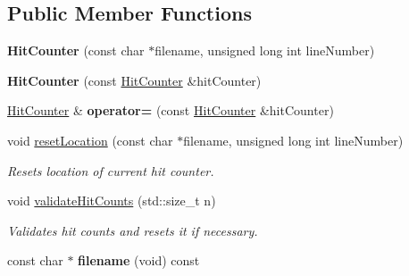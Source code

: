\subsection*{Public Member Functions}
\begin{DoxyCompactItemize}
\item 
\hypertarget{classel_1_1base_1_1HitCounter_a1fe641f45123641012673f8bc29aefd8}{{\bfseries Hit\-Counter} (const char $\ast$filename, unsigned long int line\-Number)}\label{classel_1_1base_1_1HitCounter_a1fe641f45123641012673f8bc29aefd8}

\item 
\hypertarget{classel_1_1base_1_1HitCounter_abae187cf5ea0f94e812223ee4be7061f}{{\bfseries Hit\-Counter} (const \hyperlink{classel_1_1base_1_1HitCounter}{Hit\-Counter} \&hit\-Counter)}\label{classel_1_1base_1_1HitCounter_abae187cf5ea0f94e812223ee4be7061f}

\item 
\hypertarget{classel_1_1base_1_1HitCounter_ad32a5e5c2a63ff30fa9d298613d746d1}{\hyperlink{classel_1_1base_1_1HitCounter}{Hit\-Counter} \& {\bfseries operator=} (const \hyperlink{classel_1_1base_1_1HitCounter}{Hit\-Counter} \&hit\-Counter)}\label{classel_1_1base_1_1HitCounter_ad32a5e5c2a63ff30fa9d298613d746d1}

\item 
\hypertarget{classel_1_1base_1_1HitCounter_af58479cb66b71a76a3f8fd26193bfde1}{void \hyperlink{classel_1_1base_1_1HitCounter_af58479cb66b71a76a3f8fd26193bfde1}{reset\-Location} (const char $\ast$filename, unsigned long int line\-Number)}\label{classel_1_1base_1_1HitCounter_af58479cb66b71a76a3f8fd26193bfde1}

\begin{DoxyCompactList}\small\item\em Resets location of current hit counter. \end{DoxyCompactList}\item 
\hypertarget{classel_1_1base_1_1HitCounter_a04dcca0a3f1b1f9a0ef8d812f00cecf0}{void \hyperlink{classel_1_1base_1_1HitCounter_a04dcca0a3f1b1f9a0ef8d812f00cecf0}{validate\-Hit\-Counts} (std\-::size\-\_\-t n)}\label{classel_1_1base_1_1HitCounter_a04dcca0a3f1b1f9a0ef8d812f00cecf0}

\begin{DoxyCompactList}\small\item\em Validates hit counts and resets it if necessary. \end{DoxyCompactList}\item 
\hypertarget{classel_1_1base_1_1HitCounter_ad04433d214c175775ed61453ead374fc}{const char $\ast$ {\bfseries filename} (void) const }\label{classel_1_1base_1_1HitCounter_ad04433d214c175775ed61453ead374fc}


\end{DoxyCompactItemize}
